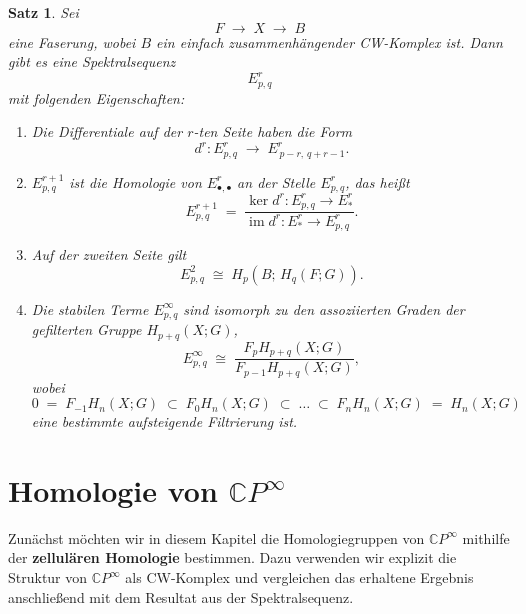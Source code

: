 \documentclass[12pt]{article}
\numberwithin{conj}{section}
\newtheorem{theorem}[conj]{Satz}
\begin{document}
    \begin{theorem}
        {\cite[Proposition 4E.1]{hatcher2001}} \label{SerreSpectralSequence} Sei
        \[
            F \;\longrightarrow\; X \;\longrightarrow\; B
        \]
        eine Faserung, wobei $B$ ein einfach zusammenhängender CW-Komplex ist. Dann gibt
        es eine Spektralsequenz
        \[
            E^{r}_{p,q}
        \]
        mit folgenden Eigenschaften:
        \begin{enumerate}[label=(\alph{*})]
            \item Die Differentiale auf der $r$-ten Seite haben die Form
                \[
                    d^{r} : E^{r}_{p,q}\;\longrightarrow\; E^{r}_{\,p-r,\,q+r-1}.
                \]

            \item $E^{r+1}_{p,q}$ ist die Homologie von $E^{r}_{\bullet,\bullet}$ an der
                Stelle $E^{r}_{p,q}$, das heißt
                \[
                    E^{r+1}_{p,q}\;=\; \frac{\ker d^{r} : E^{r}_{p,q}\to E^{r}_{\!*} }{\mathrm{im} \; d^{r}
                    : E^{r}_{\!*}\to E^{r}_{p,q} }.
                \]

            \item Auf der zweiten Seite gilt
                \[
                    E^{2}_{p,q}\;\cong\; H_{p}(B;\,H_{q}(F;G)).
                \]

            \item Die stabilen Terme $E^{\infty}_{p,q}$ sind isomorph zu den assoziierten
                Graden der gefilterten Gruppe $H_{p+q}(X;G)$,
                \[
                    E^{\infty}_{p,q}\;\cong\; \frac{F_{p}H_{p+q}(X;G)}{F_{p-1}H_{p+q}(X;G)}
                    ,
                \]
                wobei
                \[
                    0 \;=\; F_{-1}H_{n}(X;G) \;\subset\; F_{0}H_{n}(X;G) \;\subset\; \dots
                    \;\subset\; F_{n}H_{n}(X;G) \;=\; H_{n}(X;G)
                \]
                eine bestimmte aufsteigende Filtrierung ist.
        \end{enumerate}
    \end{theorem}

    \section{Homologie von $\mathbb{C}P^{\infty}$}
    \noindent
    Zunächst möchten wir in diesem Kapitel die Homologiegruppen von $\mathbb{C}P^{\infty}$
    mithilfe der \textbf{zellulären Homologie} bestimmen. Dazu verwenden wir explizit
    die Struktur von $\mathbb{C}P^{\infty}$ als CW-Komplex und vergleichen das erhaltene
    Ergebnis anschließend mit dem Resultat aus der Spektralsequenz.
\end{document}
